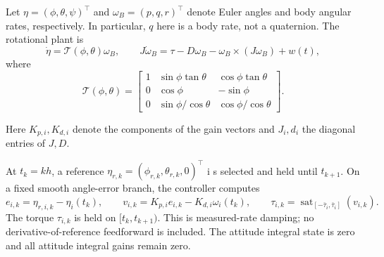\documentclass[12pt, a4paper]{article}
\begin{document}
Let $\eta=(\phi,\theta,\psi)^\top$ and
$\omega_B=(p,q,r)^\top$ denote Euler angles and body angular rates,
respectively. In particular, $q$ here is a body rate, not a quaternion. The
rotational plant is
\begin{equation}
 \dot\eta=\mathcal T(\phi,\theta)\omega_B,\qquad
 J\dot\omega_B=\tau-D\omega_B-\omega_B\times(J\omega_B)+w(t),
 \label{uhrc:eq:plant}
\end{equation}
where
\begin{equation}
 \mathcal T(\phi,\theta)=
 \begin{bmatrix}
  1&\sin\phi\tan\theta&\cos\phi\tan\theta\\
  0&\cos\phi&-\sin\phi\\
  0&\sin\phi/\cos\theta&\cos\phi/\cos\theta
 \end{bmatrix}.
 \label{uhrc:eq:kinematics}
\end{equation}

Here $K_{p,i},K_{d,i}$ denote the components of the gain vectors and
$J_i,d_i$ the diagonal entries of $J,D$.

At $t_k=kh$, a reference
$\eta_{r,k}=(\phi_{r,k},\theta_{r,k},0)^\top$ i s selected and held until
$t_{k+1}$. On a fixed smooth angle-error branch, the controller computes
\begin{equation}
 e_{i,k}=\eta_{r,i,k}-\eta_i(t_k),\qquad
 v_{i,k}=K_{p,i}e_{i,k}-K_{d,i}\omega_i(t_k),\qquad
 \tau_{i,k}=\operatorname{sat}_{[-\bar\tau_i,\bar\tau_i]}(v_{i,k}).
 \label{uhrc:eq:controller}
\end{equation}
The torque $\tau_{i,k}$ is held on $[t_k,t_{k+1})$. This is measured-rate
damping; no derivative-of-reference feedforward is included. The attitude
integral state is zero and all attitude integral gains remain zero.
\end{document}
